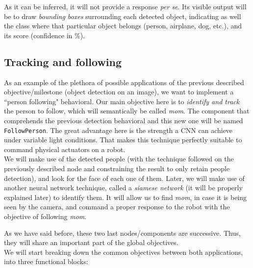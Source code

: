 			As it can be inferred, it will not provide a response \textit{per se}. Its visible output will be to draw \emph{bounding boxes} surrounding each detected object, indicating as well the class where that particular object belongs (person, airplane, dog, etc.), and its score (confidence in \%).\\
		
		\subsection{Tracking and following}
			As an example of the plethora of possible applications of the previous described objective/milestone (object detection on an image), we want to implement a ``person following" behavioral. Our main objective here is to \textit{identify and track} the person to follow, which will semantically be called \emph{mom}. The component that comprehends the previous detection behavioral and this new one will be named \texttt{FollowPerson}. The great advantage here is the strength a CNN can achieve under variable light conditions. That makes this technique perfectly suitable to command physical actuators on a robot.\\
			
			We will make use of the detected people (with the technique followed on the previously described node and constraining the result to only retain people detection), and look for the face of each one of them. Later, we will make use of another neural network technique, called a \emph{siamese network} (it will be properly explained later) to identify them. It will allow us to find \emph{mom}, in case it is being seen by the camera, and command a proper response to the robot with the objective of following \emph{mom}.\\
			
			\vspace{1in}

As we have said before, these two last nodes/components are successive. Thus, they will share an important part of the global objectives.\\

We will start breaking down the common objectives between both applications, into three functional blocks:


